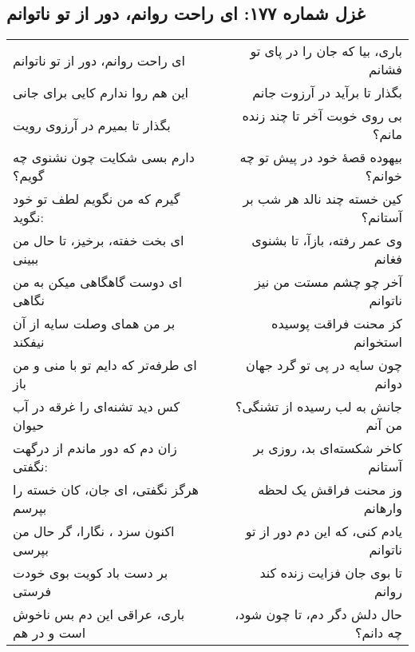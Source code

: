 \begin{center}
\section*{غزل شماره ۱۷۷: ای راحت روانم، دور از تو ناتوانم}
\label{sec:177}
\begin{longtable}{l p{0.5cm} r}
ای راحت روانم، دور از تو ناتوانم
&&
باری، بیا که جان را در پای تو فشانم
\\
این هم روا ندارم کایی برای جانی
&&
بگذار تا برآید در آرزوت جانم
\\
بگذار تا بمیرم در آرزوی رویت
&&
بی روی خوبت آخر تا چند زنده مانم؟
\\
دارم بسی شکایت چون نشنوی چه گویم؟
&&
بیهوده قصهٔ خود در پیش تو چه خوانم؟
\\
گیرم که من نگویم لطف تو خود نگوید:
&&
کین خسته چند نالد هر شب بر آستانم؟
\\
ای بخت خفته، برخیز، تا حال من ببینی
&&
وی عمر رفته، بازآ، تا بشنوی فغانم
\\
ای دوست گاهگاهی میکن به من نگاهی
&&
آخر چو چشم مستت من نیز ناتوانم
\\
بر من همای وصلت سایه از آن نیفکند
&&
کز محنت فراقت پوسیده استخوانم
\\
ای طرفه‌تر که دایم تو با منی و من باز
&&
چون سایه در پی تو گرد جهان دوانم
\\
کس دید تشنه‌ای را غرقه در آب حیوان
&&
جانش به لب رسیده از تشنگی؟ من آنم
\\
زان دم که دور ماندم از درگهت نگفتی:
&&
کاخر شکسته‌ای بد، روزی بر آستانم
\\
هرگز نگفتی، ای جان، کان خسته را بپرسم
&&
وز محنت فراقش یک لحظه وارهانم
\\
اکنون سزد ، نگارا، گر حال من بپرسی
&&
یادم کنی، که این دم دور از تو ناتوانم
\\
بر دست باد کویت بوی خودت فرستی
&&
تا بوی جان فزایت زنده کند روانم
\\
باری، عراقی این دم بس ناخوش است و در هم
&&
حال دلش دگر دم، تا چون شود، چه دانم؟
\\
\end{longtable}
\end{center}
